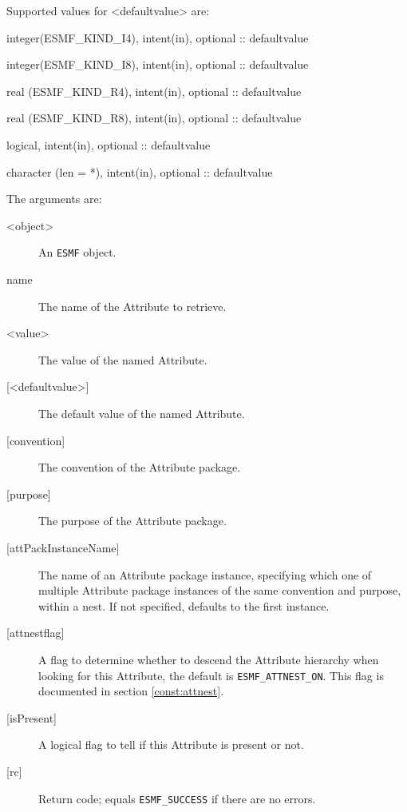    Supported values for <defaultvalue> are:
   \begin{description}
   \item integer(ESMF\_KIND\_I4), intent(in), optional :: defaultvalue
   \item integer(ESMF\_KIND\_I8), intent(in), optional :: defaultvalue
   \item real (ESMF\_KIND\_R4), intent(in), optional :: defaultvalue
   \item real (ESMF\_KIND\_R8), intent(in), optional :: defaultvalue
   \item logical, intent(in), optional :: defaultvalue
   \item character (len = *), intent(in), optional :: defaultvalue
   \end{description}
  
   The arguments are:
   \begin{description}
   \item [<object>]
   An {\tt ESMF} object.
   \item [name]
   The name of the Attribute to retrieve.
   \item [<value>]
   The value of the named Attribute.
   \item [{[<defaultvalue>]}]
   The default value of the named Attribute.
   \item [{[convention]}]
   The convention of the Attribute package.
   \item [{[purpose]}]
   The purpose of the Attribute package.
   \item [{[attPackInstanceName]}]
   The name of an Attribute package instance, specifying which one
   of multiple Attribute package instances of the same convention
   and purpose, within a nest. If not specified, defaults to the
   first instance.
   \item [{[attnestflag]}]
   A flag to determine whether to descend the
   Attribute hierarchy when looking for this Attribute, the default
   is {\tt ESMF\_ATTNEST\_ON}. This flag is documented in section
   \ref{const:attnest}.
   \item [{[isPresent]}]
   A logical flag to tell if this Attribute is present or not.
   \item [{[rc]}]
   Return code; equals {\tt ESMF\_SUCCESS} if there are no errors.
   \end{description}
  
   
 
\mbox{}\hrulefill\ 
 
